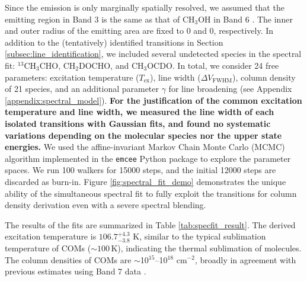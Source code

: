 \documentclass[linenumbers, twocolumn, twocolappendix, astrosymb, times]{aastex631}
\newcommand{\methanol}{CH$_3$OH\xspace}
\begin{document}
Since the emission is only marginally spatially resolved, we assumed that the emitting region in Band 3 is the same as that of \methanol in Band 6 \citep{Tobin2023}. The inner and outer radius of the emitting area are fixed to 0 and 0, respectively. 
In addition to the (tentatively) identified transitions in Section \ref{subsec:line_identification}, we included several undetected species in the spectral fit: $^{13}$CH$_3$CHO, CH$_2$DOCHO, and CH$_3$OCDO. In total, we consider 24 free parameters: excitation temperature ($T_\mathrm{ex}$), line width ($\Delta V_\mathrm{FWHM}$), column density of 21 species, and an additional parameter $\gamma$ for line broadening (see Appendix \ref{appendix:spectral_model}). \textbf{For the justification of the common excitation temperature and line width, we measured the line width of each isolated transitions with Gaussian fits, and found no systematic variations depending on the molecular species nor the upper state energies.}
We used the affine-invariant Markov Chain Monte Carlo (MCMC) algorithm implemented in the \texttt{emcee} Python package \citep{emcee} to explore the parameter spaces. We run 100 walkers for 15000 steps, and the initial 12000 steps are discarded as burn-in. Figure \ref{fig:spectral_fit_demo} demonstrates the unique ability of the simultaneous spectral fit to fully exploit the transitions for column density derivation even with a severe spectral blending. 

The results of the fits are summarized in Table \ref{tab:specfit_result}. The derived excitation temperature is $106.7_{-3.8}^{+4.3}$ K, similar to the typical sublimation temperature of COMs ($\sim100$\,K), indicating the thermal sublimation of molecules. The column densities of COMs are $\sim$10$^{15}$--10$^{18}$ cm$^{-2}$, broadly in agreement with previous estimates using Band 7 data \citep{Lee2019}. 
\end{document}
